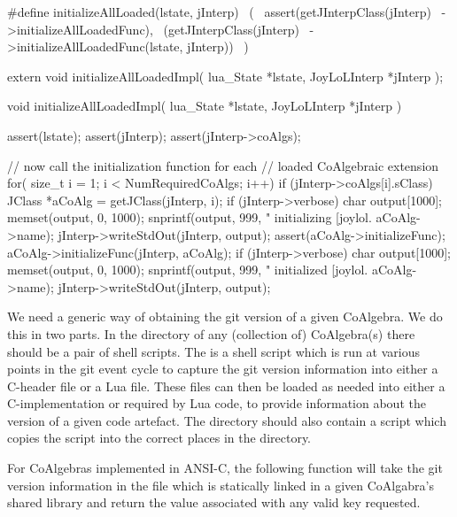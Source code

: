 \startCHeader
#define initializeAllLoaded(lstate, jInterp)      \
  (                                               \
    assert(getJInterpClass(jInterp)               \
      ->initializeAllLoadedFunc),                 \
    (getJInterpClass(jInterp)                     \
      ->initializeAllLoadedFunc(lstate, jInterp)) \
  )
\stopCHeader

\setCHeaderStream{private}
\startCHeader
extern void initializeAllLoadedImpl(
  lua_State    *lstate,
  JoyLoLInterp *jInterp
);
\stopCHeader
{}

\startCCode
void initializeAllLoadedImpl(
  lua_State    *lstate,
  JoyLoLInterp *jInterp
) {
  assert(lstate);
  assert(jInterp);
  assert(jInterp->coAlgs);
  
  // now call the initialization function for each 
  // loaded CoAlgebraic extension
  for( size_t i = 1; i < NumRequiredCoAlgs; i++) {
    if (jInterp->coAlgs[i].sClass) {
      JClass *aCoAlg = getJClass(jInterp, i);
      if (jInterp->verbose) {
        char output[1000];
        memset(output, 0, 1000);
        snprintf(output, 999, 
          "    initializing [joylol.%
          aCoAlg->name);
        jInterp->writeStdOut(jInterp, output);
      }
      assert(aCoAlg->initializeFunc);
      aCoAlg->initializeFunc(jInterp, aCoAlg);
      if (jInterp->verbose) {
        char output[1000];
        memset(output, 0, 1000);
        snprintf(output, 999, 
          "    initialized [joylol.%
          aCoAlg->name);
        jInterp->writeStdOut(jInterp, output);
      }
    }
  }
}
\stopCCode

\stopTestSuite

\startTestSuite[getGitVersion]

We need a generic way of obtaining the git version of a given CoAlgebra. 
We do this in two parts. In the  directory of any (collection 
of) CoAlgebra(s) there should be a pair of shell scripts. The 
 is a  shell script which is run at various 
points in the git event cycle to capture the git version information into 
either a C-header file or a Lua file. These files can then be loaded as 
needed into either a C-implementation or required by Lua code, to provide 
information about the version of a given code artefact. The \type{bin} 
directory should also contain a \type{setupGitHooks}  script 
which copies the \type{gitHook.sh} script into the correct places in the 
\type{.git} directory. 

For CoAlgebras implemented in ANSI-C, the following function will take the 
git version information in the \type{gitVersion.h} file which is 
statically linked in a given CoAlgabra's shared library and return the 
value associated with any valid key requested. 

